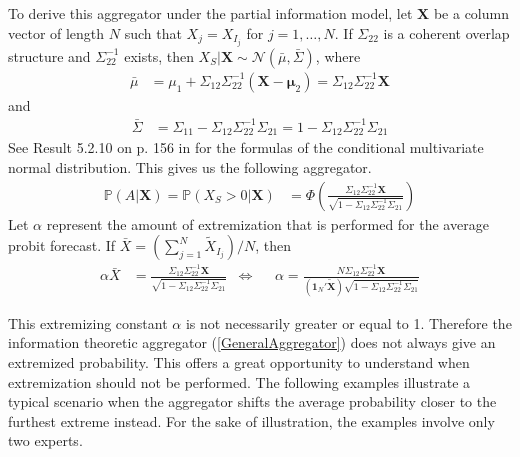 \documentclass[11pt,twoside]{article}
\renewcommand{\P}{\mathbb{P}}
\begin{document}
To derive this aggregator under the partial information model, let $\boldsymbol{X}$ be a column vector of length $N$ such that $X_j = X_{I_j}$ for $j = 1, \dots, N$. If $\Sigma_{22}$ is a coherent overlap structure and $\Sigma_{22}^{-1}$ exists, then $X_{S} | \boldsymbol{X} \sim \mathcal{N}(\bar{\mu}, \bar{\Sigma})$, where
\begin{align}
\bar{\mu} &= \mu_1 + \Sigma_{12} \Sigma_{22}^{-1} (\boldsymbol{X} - \boldsymbol{\mu}_2) =  \Sigma_{12} \Sigma_{22}^{-1} \boldsymbol{X} \label{condMu}
\end{align}
and
\begin{align}
 \bar{\Sigma}&= \Sigma_{11} - \Sigma_{12} \Sigma_{22}^{-1} \Sigma_{21} =1 - \Sigma_{12} \Sigma_{22}^{-1} \Sigma_{21}  \label{condSigma}
\end{align}
See Result 5.2.10 on p. 156 in \cite{ravishanker2001first} for the formulas of the conditional multivariate normal distribution. This gives us the following aggregator. 
\begin{align}
\P\left(A  | \boldsymbol{X}\right)  = \P\left(X_{S} > 0 | \boldsymbol{X}\right) &= \Phi\left( \frac{\Sigma_{12} \Sigma_{22}^{-1} \boldsymbol{X}}{\sqrt{1 - \Sigma_{12} \Sigma_{22}^{-1} \Sigma_{21}}}\right) \label{GeneralAggregator}
\end{align}
Let $\alpha$ represent the amount of extremization that is performed for the average probit forecast. If $\bar{X} = \left( \sum_{j=1}^N \tilde{X}_{I_j} \right)/N$, then
\begin{align}
\alpha \bar{X}&=  \frac{\Sigma_{12} \Sigma_{22}^{-1} \boldsymbol{X}}{\sqrt{1 - \Sigma_{12} \Sigma_{22}^{-1} \Sigma_{21}}}  &\Leftrightarrow&& \alpha  = \frac{N \Sigma_{12} \Sigma_{22}^{-1} \boldsymbol{X}}{\left(\boldsymbol{1}_N' \boldsymbol{\tilde{X}} \right) \sqrt{1 - \Sigma_{12} \Sigma_{22}^{-1} \Sigma_{21}}} \label{alpha}
\end{align}

This extremizing constant $\alpha$ is not necessarily greater or equal to 1. Therefore the information theoretic aggregator (\ref{GeneralAggregator}) does not always give an extremized probability. This offers a great opportunity to understand when extremization should not be performed. The following examples illustrate a typical scenario when the aggregator shifts the average probability closer to the furthest extreme instead. For the sake of illustration, the examples involve only two experts. 
\end{document}
